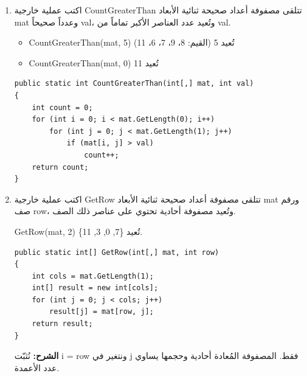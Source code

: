 \documentclass[14pt]{extarticle}
\begin{document}
\begin{enumerate}[itemsep=2em]
\item
اكتب عملية خارجية \textenglish{CountGreaterThan} تتلقى مصفوفة أعداد صحيحة ثنائية الأبعاد \textenglish{mat} وعدداً صحيحاً \textenglish{val}، وتُعيد عدد العناصر الأكبر تماماً من \textenglish{val}.

\begin{boxExample}
\begin{itemize}[itemsep=1pt]
    \item \textenglish{CountGreaterThan(mat, 5)} تُعيد \textenglish{5} \quad (القيم: 8، 9، 7، 6، 11)
    \item \textenglish{CountGreaterThan(mat, 0)} تُعيد \textenglish{11}
\end{itemize}
\end{boxExample}

\ifwithsols
\begin{boxSolution}
\begin{boxCode}
\begin{english}
\begin{verbatim}
public static int CountGreaterThan(int[,] mat, int val)
{
    int count = 0;
    for (int i = 0; i < mat.GetLength(0); i++)
        for (int j = 0; j < mat.GetLength(1); j++)
            if (mat[i, j] > val)
                count++;
    return count;
}
\end{verbatim}
\end{english}
\end{boxCode}
\end{boxSolution}
\clearpage
\fi

\item
اكتب عملية خارجية \textenglish{GetRow} تتلقى مصفوفة أعداد صحيحة ثنائية الأبعاد \textenglish{mat} ورقم صف \textenglish{row}، وتُعيد مصفوفة أحادية تحتوي على عناصر ذلك الصف.

\begin{boxExample}
\textenglish{GetRow(mat, 2)} تُعيد \textenglish{\{7, 0, 3, 11\}}.
\end{boxExample}

\ifwithsols
\begin{boxSolution}
\begin{boxCode}
\begin{english}
\begin{verbatim}
public static int[] GetRow(int[,] mat, int row)
{
    int cols = mat.GetLength(1);
    int[] result = new int[cols];
    for (int j = 0; j < cols; j++)
        result[j] = mat[row, j];
    return result;
}
\end{verbatim}
\end{english}
\end{boxCode}
\textbf{الشرح:} نُثبّت \textenglish{i = row} ونتغير في \textenglish{j} فقط. المصفوفة المُعادة أحادية وحجمها يساوي عدد الأعمدة.
\end{boxSolution}
\fi


\end{enumerate}
\end{document}
